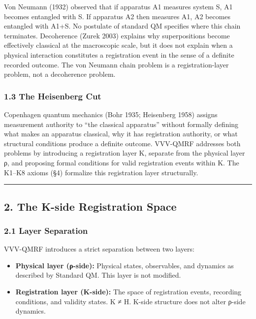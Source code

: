 \documentclass[
  11pt,
]{article}
\providecommand{\tightlist}{%
  \setlength{\itemsep}{0pt}\setlength{\parskip}{0pt}}
\begin{document}
Von Neumann (1932) observed that if apparatus A1 measures system S, A1
becomes entangled with S. If apparatus A2 then measures A1, A2 becomes
entangled with A1+S. No postulate of standard QM specifies where this
chain terminates. Decoherence (Zurek 2003) explains why superpositions
become effectively classical at the macroscopic scale, but it does not
explain when a physical interaction constitutes a registration event in
the sense of a definite recorded outcome. The von Neumann chain problem
is a registration-layer problem, not a decoherence problem.

\subsubsection{1.3 The Heisenberg Cut}\label{the-heisenberg-cut}

Copenhagen quantum mechanics (Bohr 1935; Heisenberg 1958) assigns
measurement authority to ``the classical apparatus'' without formally
defining what makes an apparatus classical, why it has registration
authority, or what structural conditions produce a definite outcome.
VVV-QMRF addresses both problems by introducing a registration layer K,
separate from the physical layer ρ, and proposing formal conditions for
valid registration events within K. The K1--K8 axioms (§4) formalize
this registration layer structurally.

\begin{center}\rule{0.5\linewidth}{0.5pt}\end{center}

\subsection{2. The K-side Registration
Space}\label{the-k-side-registration-space}

\subsubsection{2.1 Layer Separation}\label{layer-separation}

VVV-QMRF introduces a strict separation between two layers:

\begin{itemize}
\tightlist
\item
  \textbf{Physical layer (ρ-side):} Physical states, observables, and
  dynamics as described by Standard QM. This layer is not modified.
\item
  \textbf{Registration layer (K-side):} The space of registration
  events, recording conditions, and validity states. K ≠ H. K-side
  structure does not alter ρ-side dynamics.
\end{itemize}
\end{document}
